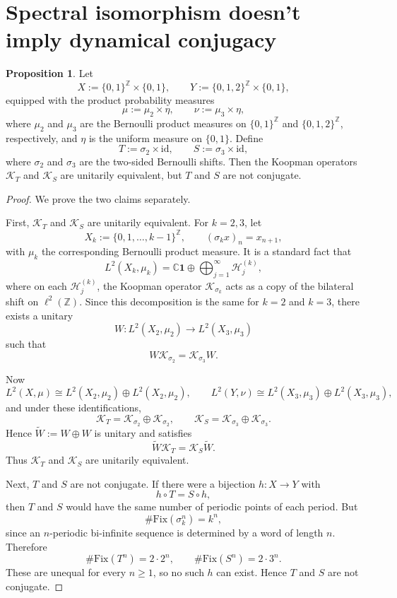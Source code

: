 \documentclass{article}
\theoremstyle{definition}
\newtheorem{proposition}{Proposition}
\begin{document}
\section{Spectral isomorphism doesn't imply dynamical conjugacy}
\label{app:counterexample}


\begin{proposition}
\label{prop:bernoulli_counterexample_appendix}
Let
\[
X:=\{0,1\}^{\mathbb Z}\times \{0,1\},
\qquad
Y:=\{0,1,2\}^{\mathbb Z}\times \{0,1\},
\]
equipped with the product probability measures
\[
\mu:=\mu_2\times \eta,
\qquad
\nu:=\mu_3\times \eta,
\]
where \(\mu_2\) and \(\mu_3\) are the Bernoulli product measures on
\(\{0,1\}^{\mathbb Z}\) and \(\{0,1,2\}^{\mathbb Z}\), respectively, and \(\eta\) is the uniform measure on \(\{0,1\}\). Define
\[
T:=\sigma_2\times \mathrm{id},
\qquad
S:=\sigma_3\times \mathrm{id},
\]
where \(\sigma_2\) and \(\sigma_3\) are the two-sided Bernoulli shifts. Then the Koopman operators \(\mathcal K_T\) and \(\mathcal K_S\) are unitarily equivalent, but \(T\) and \(S\) are not conjugate.
\end{proposition}

\begin{proof}
We prove the two claims separately.

First, \(\mathcal K_T\) and \(\mathcal K_S\) are unitarily equivalent. For \(k=2,3\), let
\[
X_k:=\{0,1,\dots,k-1\}^{\mathbb Z},
\qquad
(\sigma_kx)_n=x_{n+1},
\]
with \(\mu_k\) the corresponding Bernoulli product measure. It is a standard fact that
\[
L^2(X_k,\mu_k)
=
\mathbb C \mathbf 1
\oplus
\bigoplus_{j=1}^\infty \mathcal H_j^{(k)},
\]
where on each \(\mathcal H_j^{(k)}\), the Koopman operator \(\mathcal K_{\sigma_k}\) acts as a copy of the bilateral shift on \(\ell^2(\mathbb Z)\). Since this decomposition is the same for \(k=2\) and \(k=3\), there exists a unitary
\[
W:L^2(X_2,\mu_2)\to L^2(X_3,\mu_3)
\]
such that
\[
W\mathcal K_{\sigma_2}=\mathcal K_{\sigma_3}W.
\]

Now
\[
L^2(X,\mu)\cong L^2(X_2,\mu_2)\oplus L^2(X_2,\mu_2),
\qquad
L^2(Y,\nu)\cong L^2(X_3,\mu_3)\oplus L^2(X_3,\mu_3),
\]
and under these identifications,
\[
\mathcal K_T=\mathcal K_{\sigma_2}\oplus \mathcal K_{\sigma_2},
\qquad
\mathcal K_S=\mathcal K_{\sigma_3}\oplus \mathcal K_{\sigma_3}.
\]
Hence \(\widetilde W:=W\oplus W\) is unitary and satisfies
\[
\widetilde W \mathcal K_T = \mathcal K_S \widetilde W.
\]
Thus \(\mathcal K_T\) and \(\mathcal K_S\) are unitarily equivalent.

Next, \(T\) and \(S\) are not conjugate. If there were a bijection \(h:X\to Y\) with
\[
h\circ T=S\circ h,
\]
then \(T\) and \(S\) would have the same number of periodic points of each period. But
\[
\#\mathrm{Fix}(\sigma_k^n)=k^n,
\]
since an \(n\)-periodic bi-infinite sequence is determined by a word of length \(n\). Therefore
\[
\#\mathrm{Fix}(T^n)=2\cdot 2^n,
\qquad
\#\mathrm{Fix}(S^n)=2\cdot 3^n.
\]
These are unequal for every \(n\ge 1\), so no such \(h\) can exist. Hence \(T\) and \(S\) are not conjugate.
\end{proof}
\end{document}
